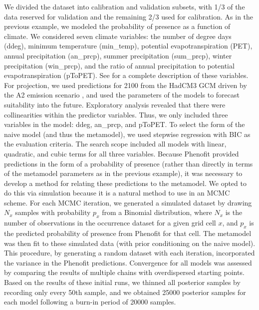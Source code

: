 \documentclass[11pt]{article}
\newcommand{\rev}[1]{{\color{RoyalBlue}#1}}
\begin{document}
We divided the dataset into calibration and validation subsets, with 1/3 of the data reserved for validation and the remaining 2/3 used for calibration.
As in the previous example, we modeled the probability of presence as a function of climate.
We considered seven climate variables: the number of degree days (ddeg), minimum temperature (min\_temp), potential evapotranspiration (PET), annual precipitation (an\_prcp), summer precipitation (sum\_prcp), winter precipitation (win\_prcp), and the ratio of annual precipitation to potential evapotranspiration (pToPET).
See \citet{Morin2009} for a complete description of these variables.
For projection, we used predictions for \rev{2100} from the HadCM3 GCM \citep{Pope2000} driven by the A2 emission scenario \citep{Nakicenovic2000}, and used the parameters of the models to forecast suitability into the future.
Exploratory analysis revealed that there were collinearities within the predictor variables.
Thus, we only included three variables in the model: ddeg, an\_prcp, and pToPET.
To select the form of the naive model (and thus the metamodel), we used stepwise regression with BIC as the evaluation criteria.
The search scope included all models with linear, quadratic, and cubic terms for all three variables.
Because Phenofit provided predictions in the form of a probability of presence (rather than directly in terms of the metamodel parameters as in the previous example), it was necessary to develop a method for relating these predictions to the metamodel.
We opted to do this via simulation because it is a natural method to use in an MCMC scheme.
For each MCMC iteration, we generated a simulated dataset by drawing \(N_x\) samples with probability \(p_x\) from a Binomial distribution, where \(N_x\) is the number of observations in the occurrence dataset for a given grid cell \(x\), and \(p_x\) is the predicted probability of presence from Phenofit for that cell.
The metamodel was then fit to these simulated data (with prior conditioning on the naive model).
This procedure, by generating a random dataset with each iteration, incorporated the variance in the Phenofit predictions.
Convergence for all models was assessed by comparing the results of multiple chains with overdispersed starting points.
Based on the results of these initial runs, we thinned all posterior samples by recording only every 50th sample, and we obtained 25000 posterior samples for each model following a burn-in period of 20000 samples.

\renewcommand\refname{Literature Cited}
{}

\end{document}
